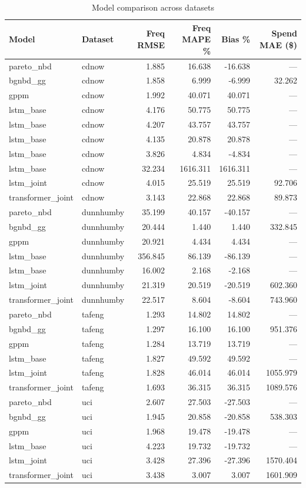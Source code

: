\begin{table}
\caption{Model comparison across datasets}
\label{tab:model_comparison}
\begin{tabular}{llrrrr}
\toprule
Model & Dataset & Freq RMSE & Freq MAPE \% & Bias \% & Spend MAE (\$) \\
\midrule
pareto_nbd & cdnow & 1.885 & 16.638 & -16.638 & — \\
bgnbd_gg & cdnow & 1.858 & 6.999 & -6.999 & 32.262 \\
gppm & cdnow & 1.992 & 40.071 & 40.071 & — \\
lstm_base & cdnow & 4.176 & 50.775 & 50.775 & — \\
lstm_base & cdnow & 4.207 & 43.757 & 43.757 & — \\
lstm_base & cdnow & 4.135 & 20.878 & 20.878 & — \\
lstm_base & cdnow & 3.826 & 4.834 & -4.834 & — \\
lstm_base & cdnow & 32.234 & 1616.311 & 1616.311 & — \\
lstm_joint & cdnow & 4.015 & 25.519 & 25.519 & 92.706 \\
transformer_joint & cdnow & 3.143 & 22.868 & 22.868 & 89.873 \\
pareto_nbd & dunnhumby & 35.199 & 40.157 & -40.157 & — \\
bgnbd_gg & dunnhumby & 20.444 & 1.440 & 1.440 & 332.845 \\
gppm & dunnhumby & 20.921 & 4.434 & 4.434 & — \\
lstm_base & dunnhumby & 356.845 & 86.139 & -86.139 & — \\
lstm_base & dunnhumby & 16.002 & 2.168 & -2.168 & — \\
lstm_joint & dunnhumby & 21.319 & 20.519 & -20.519 & 602.360 \\
transformer_joint & dunnhumby & 22.517 & 8.604 & -8.604 & 743.960 \\
pareto_nbd & tafeng & 1.293 & 14.802 & 14.802 & — \\
bgnbd_gg & tafeng & 1.297 & 16.100 & 16.100 & 951.376 \\
gppm & tafeng & 1.284 & 13.719 & 13.719 & — \\
lstm_base & tafeng & 1.827 & 49.592 & 49.592 & — \\
lstm_joint & tafeng & 1.828 & 46.014 & 46.014 & 1055.979 \\
transformer_joint & tafeng & 1.693 & 36.315 & 36.315 & 1089.576 \\
pareto_nbd & uci & 2.607 & 27.503 & -27.503 & — \\
bgnbd_gg & uci & 1.945 & 20.858 & -20.858 & 538.303 \\
gppm & uci & 1.968 & 19.478 & -19.478 & — \\
lstm_base & uci & 4.223 & 19.732 & -19.732 & — \\
lstm_joint & uci & 3.428 & 27.396 & -27.396 & 1570.404 \\
transformer_joint & uci & 3.438 & 3.007 & 3.007 & 1601.909 \\
\bottomrule
\end{tabular}
\end{table}
